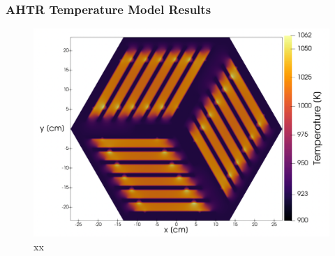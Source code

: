 \begin{frame}
    \frametitle{AHTR Temperature Model Results}
    \begin{figure}[]
        \centering
        \includegraphics[width=0.85\linewidth]{../docs/figures/benchmark-temperature-model.png} 
        \caption{xx}
    \end{figure}
\end{frame}